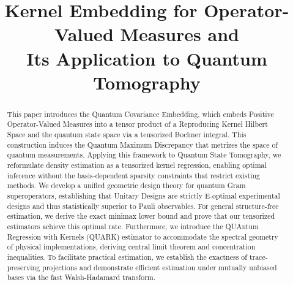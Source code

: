 \documentclass[noinfoline]{imsart}\setcounter{tocdepth}{2}
\theoremstyle{plain}
\begin{document}
\pagestyle{fancy}
\fancyhead{}
\renewcommand{\headrulewidth}{0pt} %


\begin{frontmatter}
\title{{\large Kernel Embedding for Operator-Valued Measures and \\
Its Application to Quantum Tomography}}



\begin{abstract}
This paper introduces the Quantum Covariance Embedding, which embeds Positive Operator-Valued Measures into a tensor product of a Reproducing Kernel Hilbert Space and the quantum state space via a tensorized Bochner integral. This construction induces the Quantum Maximum Discrepancy that metrizes the space of quantum measurements. Applying this framework to Quantum State Tomography, we reformulate density estimation as a tensorized kernel regression, enabling optimal inference without the basis-dependent sparsity constraints that restrict existing methods. We develop a unified geometric design theory for quantum Gram superoperators, establishing that Unitary Designs are strictly E-optimal experimental designs and thus statistically superior to Pauli observables. For general structure-free estimation, we derive the exact minimax lower bound and prove that our tensorized estimators achieve this optimal rate. Furthermore, we introduce the QUAntum Regression with Kernels (QUARK) estimator to accommodate the spectral geometry of physical implementations, deriving central limit theorem and concentration inequalities. To facilitate practical estimation, we establish the exactness of trace-preserving projections and demonstrate efficient estimation under mutually unbiased bases via the fast Walsh-Hadamard transform.
\end{abstract}



\end{frontmatter}
\end{document}
